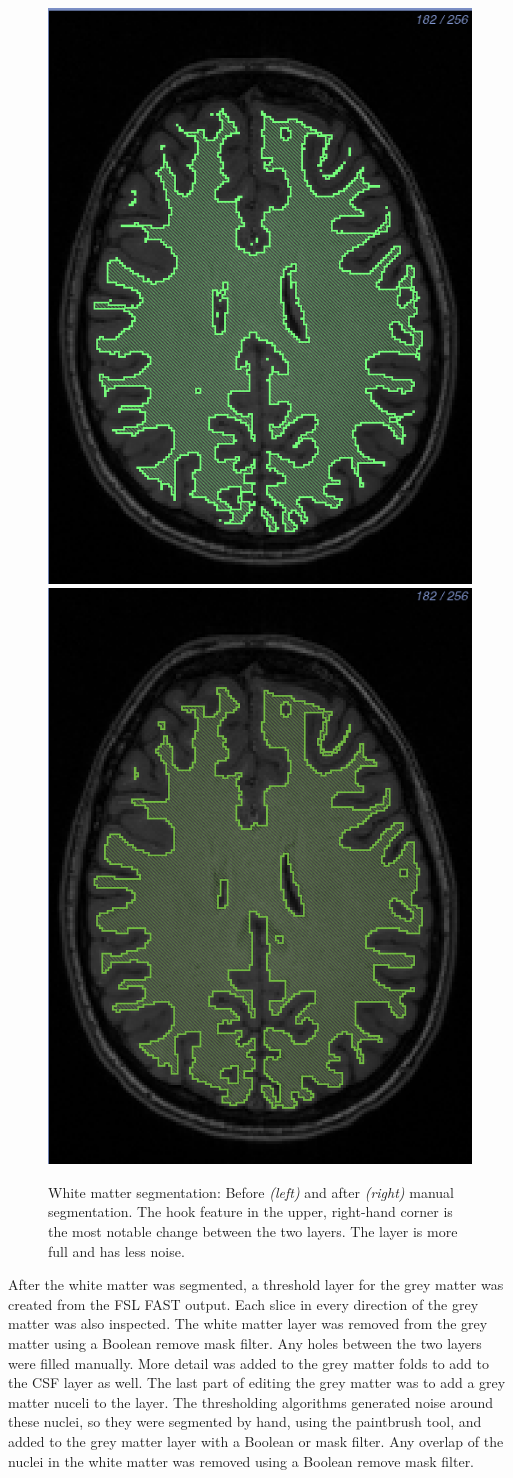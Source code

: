 \begin{figure}[H]
\begin{center}
\includegraphics[width=.49\textwidth]{Figures/whitematter_before}
\includegraphics[width=.49\textwidth]{Figures/whitematter_after}
\caption{White matter segmentation: Before \textit{(left)} and after \textit{(right)} manual segmentation. The hook feature in the upper, right-hand corner is the most notable change between the two layers. The layer is more full and has less noise.}
\label{fig:wm}
\end{center}
\end{figure}

After the white matter was segmented, a threshold layer for the grey matter was created from the FSL FAST output. Each slice in every direction of the grey matter was also inspected. The white matter layer was removed from the grey matter using a Boolean remove mask filter. Any holes between the two layers were filled manually. More detail was added to the grey matter folds to add to the CSF layer as well. The last part of editing the grey matter was to add a grey matter nuceli to the layer. The thresholding algorithms generated noise around these nuclei, so they were segmented by hand, using the paintbrush tool, and added to the grey matter layer with a Boolean or mask filter. Any overlap of the nuclei in the white matter was removed using a Boolean remove mask filter.

